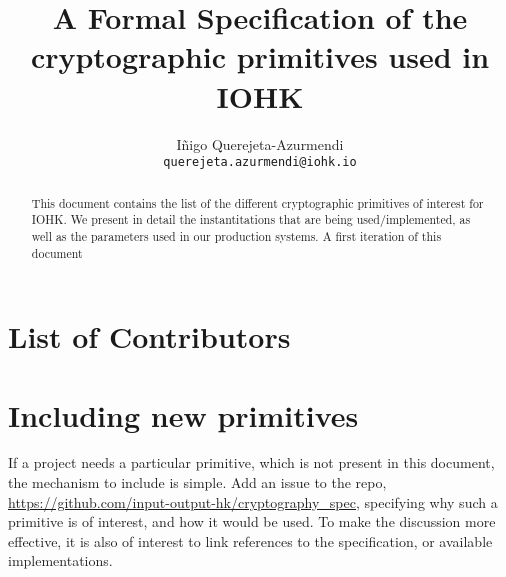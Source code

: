 \cleardoublepage%
  \tableofcontents%

  \listoffigures%
  \clearpage%
\title{A Formal Specification of the cryptographic primitives used in IOHK}

\author{I\~{n}igo Querejeta-Azurmendi  \\ {\small \texttt{querejeta.azurmendi@iohk.io}}}


\maketitle

\begin{abstract}
  This document contains the list of the different cryptographic primitives of interest for IOHK. We
  present in detail the instantitations that are being used/implemented, as well as the parameters
  used in our production systems.
  A first iteration of this document

\end{abstract}

\section*{List of Contributors}

\section*{Including new primitives}
If a project needs a particular primitive, which is not present in this document, the mechanism 
to include is simple. Add an issue to the repo, 
\url{https://github.com/input-output-hk/cryptography_spec}, specifying why such a 
primitive is of interest, and how it would be used. To make the discussion more effective, 
it is also of interest to link references to the specification, or available implementations. 
\label{acknowledgements}
